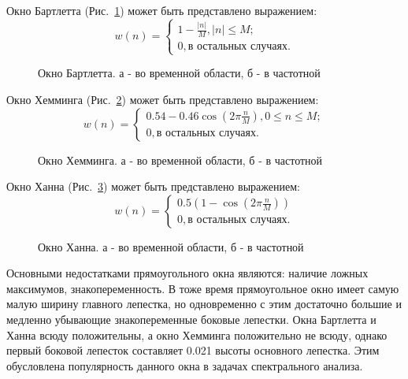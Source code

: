 Окно Бартлетта (\mbox{Рис. \ref{pic:win_bart}}) может быть представлено выражением:
\begin{equation}
	\label{eq:rect_bartlett}
	 w(n) = \begin{cases}
		1 - \frac{|n|}{M}, |n| \le M; \\
		0, \mbox{в остальных случаях}.
		\end{cases}
\end{equation}
\begin{figure}[h]
	\center{}
	\caption{Окно Бартлетта. а - во временной области, б - в частотной}
	\label{pic:win_bart}
\end{figure}

Окно Хемминга (\mbox{Рис. \ref{pic:win_hamming}}) может быть представлено выражением:
\begin{equation}
	\label{eq:rect_hamming}
	 w(n) = \begin{cases}
		0.54 - 0.46\cos \left( 2 \pi \frac{n}{M} \right), 0 \le n \le M; \\
		0, \mbox{в остальных случаях}.
		\end{cases}
\end{equation}
\begin{figure}[h]
	\center{}
	\caption{Окно Хемминга. а - во временной области, б - в частотной}
	\label{pic:win_hamming}
\end{figure}

Окно Ханна (\mbox{Рис. \ref{pic:win_hann}}) может быть представлено выражением:
\begin{equation}
	\label{eq:rect_hann}
	 w(n) = \begin{cases}
		0.5 \left( 1 - \cos\left( 2 \pi \frac{n}{M} \right) \right) \\
		0, \mbox{в остальных случаях}.
		\end{cases}
\end{equation}
\begin{figure}[h]
	\center{}
	\caption{Окно Ханна. а - во временной области, б - в частотной}
	\label{pic:win_hann}
\end{figure}

Основными недостатками прямоугольного окна являются: наличие ложных максимумов, знакопеременность. В тоже время прямоугольное окно имеет самую малую ширину главного лепестка, но
одновременно с этим достаточно большие и медленно убывающие знакопеременные боковые лепестки. Окна Бартлетта и Ханна всюду положительны, а окно Хемминга положительно не всюду, однако
первый боковой лепесток составляет 0.021 высоты основного лепестка. Этим обусловлена популярность данного окна в задачах спектрального анализа.


